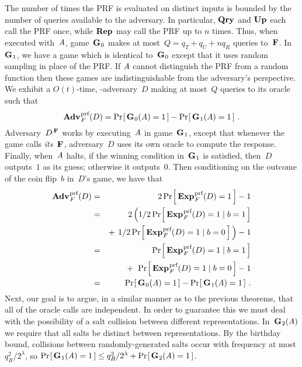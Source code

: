 The number of times the PRF is evaluated on distinct inputs is bounded by the
number of queries available to the adversary. In particular, $\textup{\textbf{Qry}}\hspace{0.5pt}$ and $\textup{\textbf{Up}}\hspace{0.5pt}$
each call the PRF once, while $\textup{\textbf{Rep}}\hspace{0.5pt}$ may call the PRF up to $n$ times. Thus,
when executed with~$\mathit{A}$, game~$\textup{\textbf{G}}\hspace{0.5pt}_0$ makes at most~$Q = q_T + q_U + nq_R$
queries to~$\textup{\textbf{F}}\hspace{0.5pt}$.
%
In~$\textup{\textbf{G}}\hspace{0.5pt}_1$, we have a game which is identical to~$\textup{\textbf{G}}\hspace{0.5pt}_0$ except that it uses
random sampling in place of the PRF. If $\mathit{A}$ cannot distinguish the PRF from
a random function then these games are indistinguishable from the adversary's
perspective.
%
We exhibit a $O(t)$-time, \prf-adversary~$D$ making at most~$Q$ queries to its
oracle such that
%
\begin{equation}
  \Adv{\prf}_F(D) = \Prob{\game_0(\advA)=1} - \Prob{\game_1(\advA)=1} \,.
\end{equation}
%
Adversary~$D^{\,\textup{\textbf{F}}\hspace{0.5pt}}$ works by executing~$\mathit{A}$ in game~$\textup{\textbf{G}}\hspace{0.5pt}_1$, except
that whenever the game calls \emph{its}~$\textup{\textbf{F}}\hspace{0.5pt}$, adversary~$D$ uses its
own oracle to compute the response.
%
Finally, when~$\mathit{A}$ halts, if the winning condition in~$\textup{\textbf{G}}\hspace{0.5pt}_1$ is satisfied,
then~$D$ outputs~$1$ as its guess; otherwise it outputs~$0$.
%
Then conditioning on the outcome of the coin flip~$b$ in~$D$'s game, we have that
%
\begin{eqnarray}
  \Adv{\prf}_F(D) &=&
    2\Prob{\Exp{\prf}_F(D)=1}-1 \\
  &=&
    2\,\Big(
      1/2\Prob{\Exp{\prf}_F(D)=1 \given b=1} \\
  && +\hspace{4pt}
      1/2\Prob{\Exp{\prf}_F(D)=1 \given b=0}
    \Big) - 1 \\
  &=&
    \Prob{\Exp{\prf}_F(D)=1 \given b=1} \\
  && +\hspace{4pt}
      \Prob{\Exp{\prf}_F(D)=1 \given b=0}
     - 1 \\
  &=& \Prob{\game_0(\advA)=1} - \Prob{\game_1(\advA)=1} \,.
\end{eqnarray}
%
Next, our goal is to argue, in a similar manner as to the previous theorems, that all
of the oracle calls are independent. In order to guarantee this we must deal
with the possibility of a salt collision between different representations.
In~$\textup{\textbf{G}}\hspace{0.5pt}_2(\mathit{A})$ we require that all salts be distinct between
representations. By the birthday bound, collisions between randomly-generated
salts occur with frequency at most $q_R^2/2^\lambda$, so $\Pr\hspace{-1pt}\left[\,\textup{\textbf{G}}\hspace{0.5pt}_1(\mathit{A}) =
1\,\right] \le q_R^2/2^\lambda + \Pr\hspace{-1pt}\left[\,\textup{\textbf{G}}\hspace{0.5pt}_2(\mathit{A}) = 1\,\right]$.

